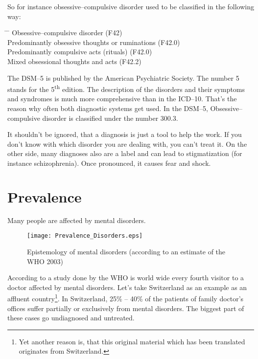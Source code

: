 \documentclass[../main.tex]{subfiles}
\begin{document}
So for instance obsessive--compulsive disorder used to be classified in the following way:

\begin{tabbing}
  \hspace{2cm} \= \hspace{1cm} \= \kill
  \>Obsessive--compulsive disorder (F42) \\
  \> \> Predominantly obsessive thoughts or ruminations (F42.0)\\
  \> \> Predominantly compulsive acts (rituals) (F42.0) \\
  \> \> Mixed obsessional thoughts and acts (F42.2) \\
\end{tabbing}

The DSM--5 is published by the American Psychiatric Society.
The number 5 stands for the 5\textsuperscript{th} edition.
The description of the disorders and their symptoms and syndromes is much more comprehensive than in the ICD--10.
That's the reason why often both diagnostic systems get used.
In the DSM--5, Obsessive--compulsive disorder is classified under the number 300.3.

It shouldn't be ignored, that a diagnosis is just a tool to help the work.
If you don't know with which disorder you are dealing with, you can't treat it.
On the other side, many diagnoses also are a label and can lead to stigmatization (for instance schizophrenia).
Once pronounced, it causes fear and shock.

\section{Prevalence}

Many people are affected by mental disorders.

\begin{figure}[htb]
  \centering
  \texttt{[image: Prevalence\_Disorders.eps]}
\caption{Epistemology of mental disorders (according to an estimate of the WHO 2003)}
\end{figure}

According to a study done by the WHO is world wide every fourth visitor to a doctor affected by mental disorders.
Let's take Switzerland as an example as an affluent country\footnote{Yet another reason is, that this 
	original material which has been translated originates from Switzerland.}.
In Switzerland, 25\% -- 40\% of the patients of family doctor's offices suffer partially or exclusively from mental disorders. The biggest part of these cases go undiagnosed and untreated.
\end{document}
